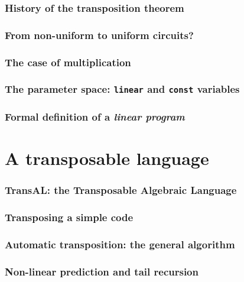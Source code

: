 \documentclass[10pt]{beamer}
\begin{document}

\begin{frame}
  \frametitle{History of the transposition theorem}

\end{frame}


\begin{frame}
  \frametitle{From non-uniform to uniform circuits?}

\end{frame}


\begin{frame}
  \frametitle{The case of multiplication}

\end{frame}


\begin{frame}
  \frametitle{The parameter space: \texttt{linear} and \texttt{const}
    variables}

\end{frame}


\begin{frame}
  \frametitle{Formal definition of a \emph{linear program}}

\end{frame}


\section{A transposable language}

\begin{frame}
  \frametitle{TransAL: the Transposable Algebraic Language}

\end{frame}


\begin{frame}
  \frametitle{Transposing a simple code}

\end{frame}


\begin{frame}
  \frametitle{Automatic transposition: the general algorithm}

\end{frame}


\begin{frame}
  \frametitle{Non-linear prediction and tail recursion}

\end{frame}
\end{document}
